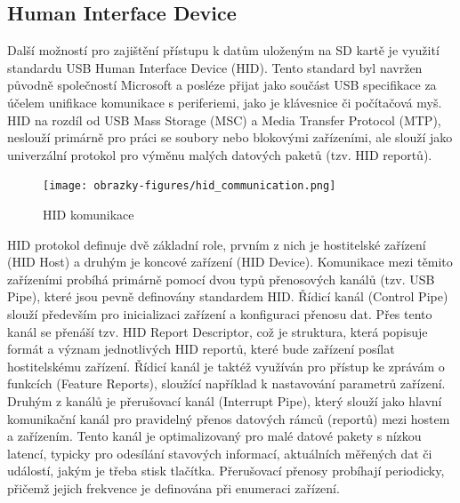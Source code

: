 \subsection{Human Interface Device}
Další možností pro zajištění přístupu k datům uloženým na SD kartě je využití standardu USB Human Interface Device (HID). Tento standard byl navržen původně společností Microsoft a posléze přijat jako součást USB specifikace za účelem unifikace komunikace s periferiemi, jako je klávesnice či počítačová myš. HID na rozdíl od USB Mass Storage (MSC) a Media Transfer Protocol (MTP), neslouží primárně pro práci se soubory nebo blokovými zařízeními, ale slouží jako univerzální protokol pro výměnu malých datových paketů (tzv. HID reportů). \cite{usb_standard_hid, silicon_labs_human_interface_device}

\begin{figure}[h]
    \centering
    \texttt{[image: obrazky-figures/hid\_communication.png]}
    
    \caption{HID komunikace \cite{usb_standard_hid}}
    \label{fig:hid-communication}
\end{figure}

HID protokol definuje dvě základní role, prvním z nich je hostitelské zařízení (HID Host) a druhým je koncové zařízení (HID Device). Komunikace mezi těmito zařízeními probíhá primárně pomocí dvou typů přenosových kanálů (tzv. USB Pipe), které jsou pevně definovány standardem HID. Řídicí kanál (Control Pipe) slouží především pro inicializaci zařízení a konfiguraci přenosu dat. Přes tento kanál se přenáší tzv. HID Report Descriptor, což je struktura, která popisuje formát a význam jednotlivých HID reportů, které bude zařízení posílat hostitelskému zařízení. Řídicí kanál je taktéž využíván pro přístup ke zprávám o funkcích (Feature Reports), sloužící například k nastavování parametrů zařízení. Druhým z kanálů je přerušovací kanál (Interrupt Pipe), který slouží jako hlavní komunikační kanál pro pravidelný přenos datových rámců (reportů) mezi hostem a zařízením. Tento kanál je optimalizovaný pro malé datové pakety s nízkou latencí, typicky pro odesílání stavových informací, aktuálních měřených dat či událostí, jakým je třeba stisk tlačítka. Přerušovací přenosy probíhají periodicky, přičemž jejich frekvence je definována při enumeraci zařízení. \cite{usb_standard_hid, silicon_labs_human_interface_device}

